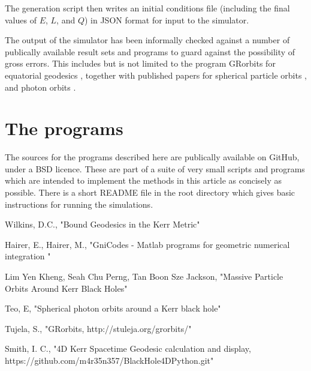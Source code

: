 \documentclass[11pt]{article}
\begin{document}
The generation script then writes an initial conditions file (including the final values of $E$, $L$, and $Q$) in JSON format for input to the simulator.

The output of the simulator has been informally checked against a number of publically available result sets and programs to guard against the possibility of gross errors.  This includes  but is not limited to the program GRorbits for equatorial geodesics \cite{grorbits}, together with published papers for spherical particle orbits \cite{teo}, and photon orbits \cite{kheng}.

\section{The programs}

The sources for the programs \cite{m4r35n357} described here are publically available on GitHub, under a BSD licence.  These are part of a suite of very small scripts and programs which are intended to implement the methods in this article as concisely as possible.  There is a short README file in the root directory which gives basic instructions for running the simulations.

\begin{thebibliography}{1}

   Wilkins, D.C., "Bound Geodesics in the Kerr Metric"

    Hairer, E., Hairer, M., "GniCodes - Matlab programs for geometric numerical integration "

   Lim Yen Kheng, Seah Chu Perng, Tan Boon Sze Jackson, "Massive Particle Orbits Around Kerr Black Holes"

   Teo, E, "Spherical photon orbits around a Kerr black hole"
  
   Tujela, S., "GRorbits, http://stuleja.org/grorbits/"
  
   Smith, I. C., "4D Kerr Spacetime Geodesic calculation and display, https://github.com/m4r35n357/BlackHole4DPython.git"

\end{thebibliography}
\end{document}
